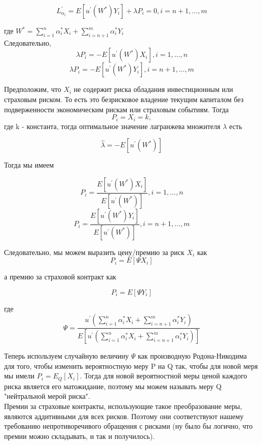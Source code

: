 \documentclass[12pt,a4paper]{article}
\begin{document}
$$ L^{'}_{\alpha_i}= E \left[  u^{'}(W^{*}) Y_i \right]  + \lambda P_i= 0  ,  i = n+1, \dots, m$$

где $ W^{*} = \sum\limits_{i=1}^{n} \alpha^{*}_i X_i +  \sum\limits_{i=n+1}^{m} \alpha^{*}_i Y_i $\\

Следовательно, 
$$  \lambda P_i = -  E \left[  u^{'}(W^{*}) X_i \right] ,   i = 1, \dots, n$$
$$  \lambda P_i = -  E \left[  u^{'}(W^{*}) Y_i \right] ,   i = n+1, \dots, m$$


Предположим, что $X_i$ не содержит риска обладания инвестиционным или страховым риском. То есть это безрисковое владение текущим капиталом без подверженности экономическим рискам или страховым событиям. Тогда $$ P_i= X_i= k,$$  где k - константа, тогда оптимальное значение лагранжева множителя $\lambda$ есть 

$$ \hat  {\lambda } = -  E \left[  u^{'}(W^{*}) \right] $$

Тогда мы имеем 

$$  P_i = \frac { E \left[  u^{'}(W^{*}) X_i \right] } { E \left[  u^{'}(W^{*}) \right] },   i = 1, \dots, n$$
$$  P_i = \frac { E \left[  u^{'}(W^{*}) Y_i \right] } { E \left[  u^{'}(W^{*}) \right] },   i = n+1, \dots, m$$


Следовательно, мы можем выразить цену/премию за риск $X_i$ как 
$$P_i= E \left[ \Psi X_i  \right]$$

а премию за страховой контракт как 

$$P_i= E \left[ \Psi Y_i  \right]$$

где $$ \Psi =  \frac 
{  u^{'}(\sum\limits_{i=1}^{n} \alpha^{*}_i X_i +  \sum\limits_{i=n+1}^{m} \alpha^{*}_i Y_i )} 
{ E \left[  u^{'}(\sum\limits_{i=1}^{n} \alpha^{*}_i X_i +  \sum\limits_{i=n+1}^{m} \alpha^{*}_i Y_i ) \right] }$$


Теперь используем случайную величину $\Psi$ как производную Родона-Никодима для того, чтобы изменить вероятностную меру P на Q так, чтобы для новой меря мы имели $P_i= E_{Q} \left[ X_i  \right].$
Тогда для новой вероятностной меры ценой каждого риска является его матожидание, поэтому мы можем называть меру Q  "нейтральной мерой риска". \\
Премии за страховые контракты, использующие такое преобразование меры, являются аддитивными для всех рисков. Поэтому они соответствуют нашему требованию непротиворечивого обращения с рисками (ну было бы логично, что премии  можно складывать, и так и получилось).\\
\end{document}

